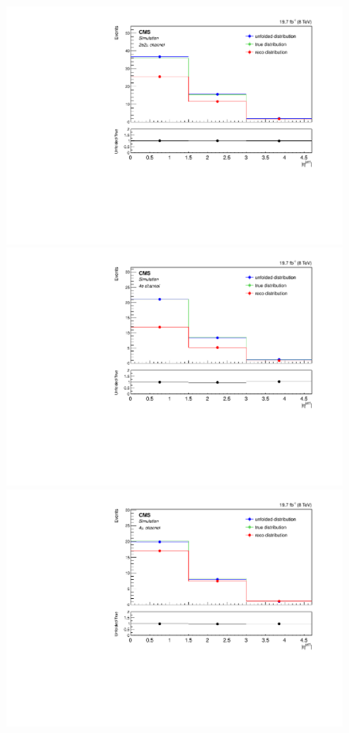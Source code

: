 \begin{figure}[hbtp]
\begin{center}
    \includegraphics[width=0.8\cmsFigWidth]{Figures/Unfolding/MCTests/EtaJet1_ZZTo2e2m_MadMatrix_PowDistr_FullSample_fr}
     \includegraphics[width=0.8\cmsFigWidth]{Figures/Unfolding/MCTests/EtaJet1_ZZTo4e_PowMatrix_MadDistr_FullSample_fr}     
    \includegraphics[width=0.8\cmsFigWidth]{Figures/Unfolding/MCTests/EtaJet1_ZZTo4m_PowMatrix_MadDistr_FullSample_fr}     

\end{center}
\end{figure}

